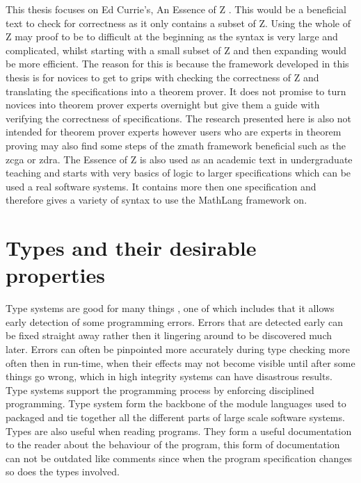 This thesis focuses on Ed Currie's, An Essence of Z \cite{essenceofz}. This would be a beneficial text to check for correctness as it only contains a subset of Z. Using the whole of Z may proof to be to difficult at the beginning as the syntax is very large and complicated, whilst starting with a small subset of Z and then expanding would be more efficient. The reason for this is because the framework developed in this thesis is for novices to get to grips with checking the correctness of Z and translating the specifications into a theorem prover. It does not promise to turn novices into theorem prover experts overnight but give them a guide with verifying the correctness of specifications. The research presented here is also not intended for theorem prover experts however users who are experts in theorem proving may also find some steps of the \gls{zmath} framework beneficial such as the \gls{zcga} or \gls{zdra}. The Essence of Z is also used as an academic text in undergraduate teaching and starts with very basics of logic to larger specifications which can be used a real software systems. It contains more then one specification and therefore gives a variety of syntax to use the MathLang framework on.

\section{Types and their desirable properties}

Type systems are good for many things \cite{pierce}, one of which includes that it allows early detection of some programming errors. Errors that are detected early can be fixed straight away rather then it lingering around to be discovered much later. Errors can often be pinpointed more accurately during type checking more often then in run-time, when their effects may not become visible until after some things go wrong, which in high integrity systems can have disastrous results. Type systems support the programming process by enforcing disciplined programming. Type system form the backbone of the module languages used to packaged and tie together all the different parts of large scale software systems. Types are also useful when reading programs. They form a useful documentation to the reader about the behaviour of the program, this form of documentation can not be outdated like comments since when the program specification changes so does the types involved.

